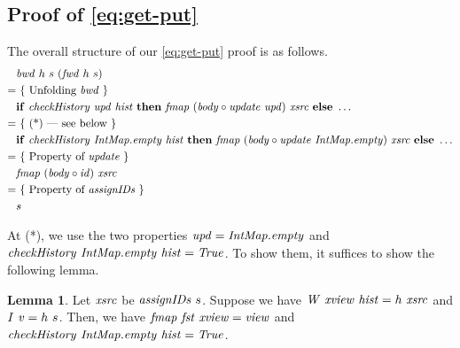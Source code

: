 \documentclass{article}
\theoremstyle{definition}
\newtheorem{lemma}{Lemma}
\begin{document}
\subsection{Proof of \ref{eq:get-put}}

The overall structure of our \ref{eq:get-put} proof is as follows. 
\begin{align*}
  & \mathit{bwd}~h~s~(\mathit{fwd}~h~s) \\
= & ~\{ \mbox{ Unfolding $\mathit{bwd}$ } \}\\
  & \mathbf{if}~ \mathit{checkHistory}~\mathit{upd}~\mathit{hist}~\mathbf{then}~ \mathit{fmap}~(\mathit{body} \circ \mathit{update}~\mathit{upd})~\mathit{xsrc}~\mathbf{else}~\dots \\
= & ~\{ 
    \mbox{ (*) --- see below }\}\\
  & \mathbf{if}~ \mathit{checkHistory}~\mathit{IntMap.empty}~\mathit{hist}~\mathbf{then}~ \mathit{fmap}~(\mathit{body} \circ \mathit{update}~\mathit{IntMap.empty})~\mathit{xsrc}~\mathbf{else}~\dots \\
= & ~\{ \mbox{ Property of $\mathit{update}$ } \}\\
  & \mathit{fmap}~(\mathit{body} \circ \mathit{id})~\mathit{xsrc}\\
= & ~\{ \mbox{ Property of $\mathit{assignIDs}$ } \}\\
  & s 
\end{align*}

At (*), we use the two properties
$\mathit{upd} = \mathit{IntMap.empty}$ and $\mathit{checkHistory}~\mathit{IntMap.empty}~\mathit{hist} = \mathit{True}$. To show them, it suffices to show the following lemma.
\begin{lemma}
Let $\mathit{xsrc}$ be $\mathit{assignIDs}~s$.
Suppose we have $\mathit{W}~\mathit{xview}~\mathit{hist} = h~\mathit{xsrc}$ 
and $\mathit{I}~\mathit{v} = h~s$.
Then, we have $\mathit{fmap}~\mathit{fst}~\mathit{xview} = \mathit{view}$ and 
$\mathit{checkHistory}~\mathit{IntMap.empty}~\mathit{hist} = \mathit{True}$.
\end{lemma}
\end{document}
